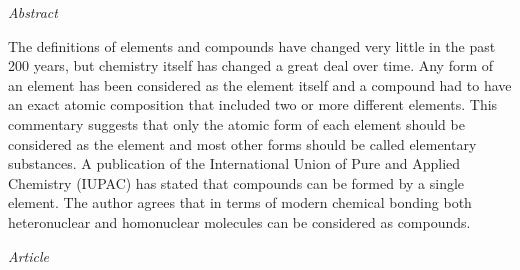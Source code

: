 \documentclass{article}
\begin{document}
\textit{Abstract}

The definitions of elements and compounds have changed very little in the past 200 years, but chemistry itself has changed a great deal over time. Any form of an element has been considered as the element itself and a compound had to have an exact atomic composition that included two or more different elements. This commentary suggests that only the atomic form of each element should be considered as the element and most other forms should be called elementary substances. A publication of the International Union of Pure and Applied Chemistry (IUPAC) has stated that compounds can be formed by a single element. The author agrees that in terms of modern chemical bonding both heteronuclear and homonuclear molecules can be considered as compounds.



\textit{Article}
\end{document}
